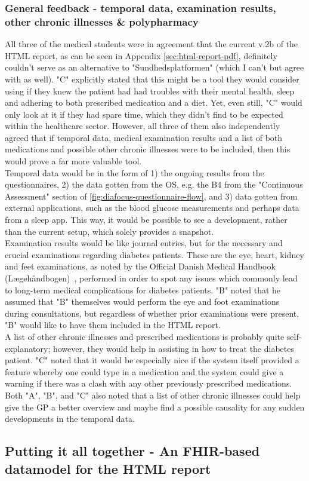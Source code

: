 \subsubsection*{General feedback - temporal data, examination results, other chronic illnesses \& polypharmacy}
All three of the medical students were in agreement that the current v.2b of the HTML report, as can be seen in Appendix \autoref{sec:html-report-pdf}, definitely couldn't serve as an alternative to "Sundhedsplatformen" (which I can't but agree with as well). "C" explicitly stated that this might be a tool they would consider using if they knew the patient had had troubles with their mental health, sleep and adhering to both prescribed medication and a diet. Yet, even still, "C" would only look at it if they had spare time, which they didn't find to be expected within the healthcare sector. However, all three of them also independently agreed that if temporal data, medical examination results and a list of both medications and possible other chronic illnesses were to be included, then this would prove a far more valuable tool.
\\
Temporal data would be in the form of 1) the ongoing results from the questionnaires, 2) the data gotten from the OS, e.g. the B4 from the "Continuous Assessment" section of \autoref{fig:diafocus-questionnaire-flow}, and 3) data gotten from external applications, such as the blood glucose measurements and perhaps data from a sleep app. This way, it would be possible to see a development, rather than the current setup, which solely provides a snapshot. 
\\
Examination results would be like journal entries, but for the necessary and crucial examinations regarding diabetes patients. These are the eye, heart, kidney and feet examinations, as noted by the Official Danish Medical Handbook (Lægehåndbogen)~\cite{SundhedDK-diabetes}, performed in order to spot any issues which commonly lead to long-term medical complications for diabetes patients. "B" noted that he assumed that "B" themselves would perform the eye and foot examinations during consultations, but regardless of whether prior examinations were present, "B" would like to have them included in the HTML report. 
\\
A list of other chronic illnesses and prescribed medications is probably quite self-explanatory; however, they would help in assisting in how to treat the diabetes patient. "C" noted that it would be especially nice if the system itself provided a feature whereby one could type in a medication and the system could give a warning if there was a clash with any other previously prescribed medications. Both "A", "B", and "C" also noted that a list of other chronic illnesses could help give the GP a better overview and maybe find a possible causality for any sudden developments in the temporal data.

\subsection{Putting it all together - An FHIR-based datamodel for the HTML report}

